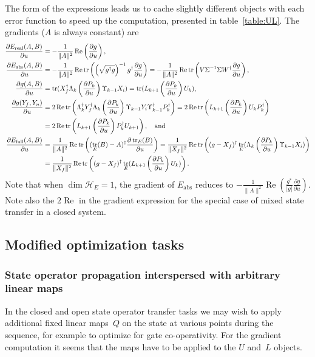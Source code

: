 \documentclass[aps, pra, a4paper, longbibliography, superscriptaddress]{revtex4-1}
\newcommand{\hilb}[1]{\mathcal{#1}}
\DeclareMathOperator{\tr}{tr}
\DeclareMathOperator{\re}{Re}
\newcommand{\spr}{\Upsilon}
\newcommand{\dd}[2]{\frac{\partial #1}{\partial #2}}
\begin{document}
The form of the expressions leads us to cache slightly different objects with
each error function to speed up the computation, presented in table~\ref{table:UL}.
The gradients ($A$ is always constant) are
\begin{align}
\dd{E_\text{real}(A,B)}{u}
&= -\frac{1}{\|A\|^2} \re \left( \dd{g}{u} \right),\\
\dd{E_\text{abs}(A,B)}{u}
&= -\frac{1}{\|A\|^2} \re \tr \left(\left(\sqrt{g^\dagger g}\right)^{-1} g^\dagger \dd{g}{u}\right)
= -\frac{1}{\|A\|^2} \re \tr \left(V \Sigma^{-1} \Sigma W^\dagger \dd{g}{u}\right),\\
\dd{g(A, B)}{u} &= \tr(X_f^\dagger \Lambda_{k} \left(\dd{P_k}{u}\right) \spr_{k-1} X_i)
= \tr(L_{k+1} \left(\dd{P_k}{u}\right) U_{k}),\\
\notag
\dd{g(Y_f, Y_n)}{u} &= 2 \re \tr\left(\Lambda_k^\dagger Y_f^\dagger \Lambda_k \left(\dd{P_k}{u}\right) \spr_{k-1} Y_i \spr_{k-1}^\dagger P_k^\dagger \right)
= 2 \re \tr\left(L_{k+1} \left(\dd{P_k}{u}\right) U_{k} P_k^\dagger \right)\\
&= 2 \re \tr\left(L_{k+1} \left(\dd{P_k}{u}\right) P_k^\dagger U_{k+1} \right), \quad \text{and}\\
\notag
\dd{E_\text{full}(A, B)}{u}
&= \frac{1}{\|A\|^2} \re \tr\left((\tr_E(B)-A)^\dagger \dd{\tr_E(B)}{u}\right)
= \frac{1}{\|X_f\|^2} \re \tr\left((g -X_f)^\dagger  \tr_E(\Lambda_{k} \left(\dd{P_k}{u}\right) \spr_{k-1} X_i) \right)\\
&= \frac{1}{\|X_f\|^2} \re \tr\left((g -X_f)^\dagger  \tr_E(L_{k+1} \left(\dd{P_k}{u}\right) U_{k}) \right).
\end{align}
Note that when $\dim \hilb{H}_E = 1$, the gradient of $E_\text{abs}$
reduces to
$-\frac{1}{\|A\|^2} \re \left(\frac{g^*}{|g|} \dd{g}{u} \right)$.\\
Note also the $2 \re$ in the gradient expression  
for the special case of mixed state transfer in a closed system.


\subsection{Modified optimization tasks}

\subsubsection{State operator propagation interspersed with arbitrary linear maps}

In the closed and open state operator transfer tasks we may wish to apply additional fixed linear maps~$Q$
on the state at various points during the sequence, for example to optimize for gate co-operativity.
For the gradient computation it seems that the maps have to be applied to the $U$ and~$L$ objects.
\end{document}

